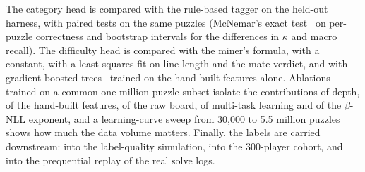 The category head is compared with the rule-based tagger on the held-out harness, with paired tests on
the same puzzles (McNemar's exact test~\cite{mcnemar1947note} on per-puzzle correctness and bootstrap
intervals for the differences in $\kappa$ and macro recall). The difficulty head is compared with the
miner's formula, with a constant, with a least-squares fit on line length and the mate verdict, and
with gradient-boosted trees~\cite{ke2017lightgbm} trained on the hand-built features alone. Ablations
trained on a common one-million-puzzle subset isolate the contributions of depth, of the hand-built
features, of the raw board, of multi-task learning and of the $\beta$-NLL exponent, and a
learning-curve sweep from 30{,}000 to 5.5 million puzzles shows how much the data volume matters.
Finally, the labels are carried downstream: into the label-quality simulation, into the 300-player
cohort, and into the prequential replay of the real solve logs.
